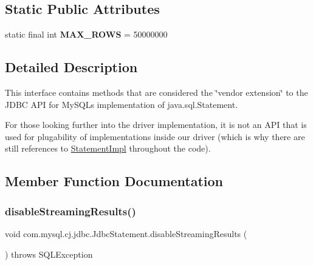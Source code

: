 \subsection*{Static Public Attributes}
\begin{DoxyCompactItemize}
\item 
\mbox{\label{interfacecom_1_1mysql_1_1cj_1_1jdbc_1_1_jdbc_statement_af93a548fefe7b195a578434d9e647a7d}} 
static final int {\bfseries M\+A\+X\+\_\+\+R\+O\+WS} = 50000000
\end{DoxyCompactItemize}


\subsection{Detailed Description}
This interface contains methods that are considered the \char`\"{}vendor extension\char`\"{} to the J\+D\+BC A\+PI for My\+S\+QL\textquotesingle{}s implementation of java.\+sql.\+Statement.

For those looking further into the driver implementation, it is not an A\+PI that is used for plugability of implementations inside our driver (which is why there are still references to \mbox{\hyperlink{classcom_1_1mysql_1_1cj_1_1jdbc_1_1_statement_impl}{Statement\+Impl}} throughout the code). 

\subsection{Member Function Documentation}
\mbox{\label{interfacecom_1_1mysql_1_1cj_1_1jdbc_1_1_jdbc_statement_a11240571041f264e6bdde12ee05355a5}} 
\subsubsection{\texorpdfstring{disable\+Streaming\+Results()}{disableStreamingResults()}}
{\footnotesize\ttfamily void com.\+mysql.\+cj.\+jdbc.\+Jdbc\+Statement.\+disable\+Streaming\+Results (\begin{DoxyParamCaption}{ }\end{DoxyParamCaption}) throws S\+Q\+L\+Exception}

